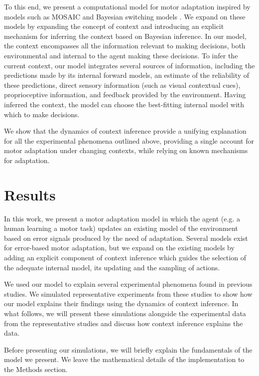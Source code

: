 \documentclass[a4paper,doc,floatsintext,natbib]{apa6}
\begin{document}
To this end, we present a computational model for motor adaptation inspired by models such as MOSAIC \citep{Wolpert_Multiple_1998} and Bayesian switching models \citep{Kording_Bayesian_2004,Oh_Minimizing_2019}. We expand on these models by expanding the concept of context and introducing an explicit mechanism for inferring the context based on Bayesian inference. In our model, the context encompasses all the information relevant to making decisions, both environmental and internal to the agent making these decisions. To infer the current context, our model integrates several sources of information, including the predictions made by its internal forward models, an estimate of the reliability of these predictions, direct sensory information (such as visual contextual cues), proprioceptive information, and feedback provided by the environment. Having inferred the context, the model can choose the best-fitting internal model with which to make decisions.

We show that the dynamics of context inference provide a unifying explanation for all the experimental phenomena outlined above, providing a single account for motor adaptation under changing contexts, while relying on known mechanisms for adaptation.

\section{Results}
In this work, we present a motor adaptation model in which the agent (e.g. a human learning a motor task) updates an existing model of the environment based on error signals produced by the need of adaptation. Several models exist for error-based motor adaptation, but we expand on the existing models by adding an explicit component of context inference which guides the selection of the adequate internal model, its updating and the sampling of actions.

We used our model to explain several experimental phenomena found in previous studies. We simulated representative experiments from these studies to show how our model explains their findings using the dynamics of context inference. In what follows, we will present these simulations alongside the experimental data from the representative studies and discuss how context inference explains the data.

Before presenting our simulations, we will briefly explain the fundamentals of the model we present. We leave the mathematical details of the implementation to the Methods section.
\end{document}
